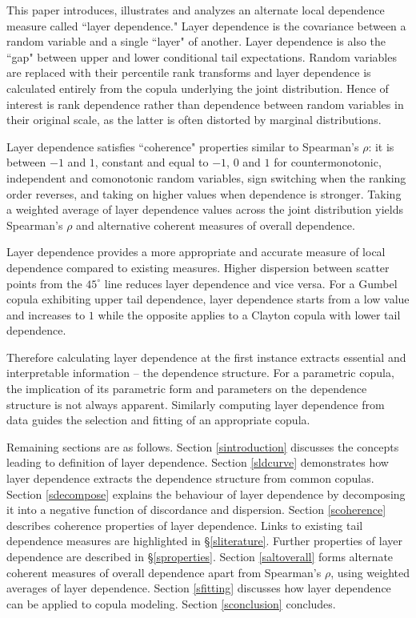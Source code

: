 \documentclass[authoryear]{elsarticle}
\newcommand{\sref}[1]{\S\ref{#1}}
\newcommand{\aref}[1]{\ref{#1}}
\begin{document}
This paper introduces, illustrates and analyzes an alternate local dependence measure called  ``layer dependence." Layer dependence is the covariance between a random variable and a single ``layer" of another. Layer dependence is also the ``gap" between upper and lower conditional tail expectations. Random variables are replaced with their percentile rank transforms and layer dependence is calculated entirely from the copula underlying the joint distribution. Hence of interest is rank dependence rather than dependence between random variables in their original scale, as the latter is often distorted by marginal distributions.


Layer dependence satisfies ``coherence" properties similar to Spearman's $\rho$: it is between $-1$ and $1$, constant and equal to $-1$, $0$ and $1$ for countermonotonic, independent and comonotonic random variables, sign switching when the ranking order reverses, and taking on higher values when dependence is stronger. Taking a weighted average of layer dependence values across the joint distribution yields Spearman's $\rho$ and alternative coherent measures of overall dependence.


Layer dependence provides a more appropriate and accurate measure of local dependence compared to existing measures. Higher dispersion between scatter points from the $45^\circ$ line reduces layer dependence and vice versa. For a Gumbel copula exhibiting upper tail dependence, layer dependence starts from a low value and increases to $1$ while the opposite applies to a Clayton copula with lower tail dependence.

Therefore calculating layer dependence at the first instance extracts essential and interpretable information -- the dependence structure. For a parametric copula, the implication of its parametric form and parameters on the dependence structure is not always apparent. Similarly computing layer dependence from data guides the selection and fitting of an appropriate copula. 


Remaining sections are as follows. Section \aref{sintroduction} discusses the concepts leading to definition of layer dependence. Section \aref{sldcurve} demonstrates how layer dependence extracts the dependence structure from common copulas. Section \aref{sdecompose} explains the behaviour of layer dependence by decomposing it into a negative function of discordance and dispersion. Section \aref{scoherence} describes coherence properties of layer dependence. Links to existing tail dependence measures are highlighted in  \sref{sliterature}. Further properties of layer dependence are described in  \sref{sproperties}. Section \aref{saltoverall} forms alternate coherent measures of overall dependence apart from Spearman's $\rho$, using weighted averages of layer dependence. Section \aref{sfitting} discusses how layer dependence can be applied to copula modeling. Section \aref{sconclusion} concludes.
\end{document}
